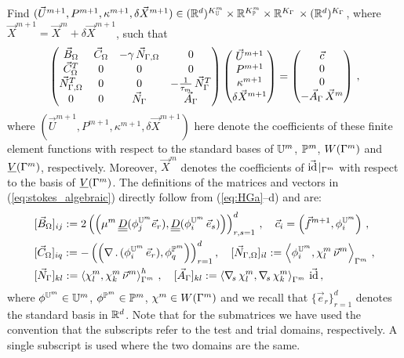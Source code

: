 Find $(\vec U^{m+1},P^{m+1}, \kappa^{m+1},\delta\vec{X}^{m+1})\in
({\mathbb R}^d)^{K^m_{\mathbb{U}}}\times {\mathbb R}^{K^m_{\mathbb{P}}} \times {\mathbb R}^{K_\Gamma}\,\times
({\mathbb R}^d)^{K_\Gamma}$, where $\vec X^{m+1} = \vec X^m+ \delta\vec X^{m+1}$, such
that
\begin{equation}
\begin{pmatrix}
\vec B_\Omega & \vec C_\Omega & -\gamma\,\vec{N}_{\Gamma,\Omega} & 0 \\
\vec C^T_\Omega & 0 & 0 & 0 \\
\vec{N}_{\Gamma,\Omega}^T & 0 & 0 & -\frac1{\tau_m}\,\vec{N}_\Gamma^T \\
0 & 0 & \vec{N}_\Gamma & \vec{A}_\Gamma
\end{pmatrix}
\begin{pmatrix}
\vec U^{m+1} \\
P^{m+1} \\
\kappa^{m+1} \\
\delta\vec{X}^{m+1}
\end{pmatrix}
=
\begin{pmatrix}
\vec c \\
0 \\
0 \\
-\vec{A}_\Gamma\,\vec X^m
\end{pmatrix} \,,
\label{eq:stokes_algebraic}
\end{equation}
where $(\vec U^{m+1},P^{m+1},\kappa^{m+1},\delta\vec{X}^{m+1})$ here denote the
coefficients of these finite element functions with respect to the standard
bases of $\mathbb{U}^m$, $\mathbb{P}^m$, $W(\Gamma^m)$ and $\underline{V}(\Gamma^m)$, respectively. Moreover,
$\vec X^m$ denotes the coefficients of $\vec{\rm id}\!\mid_{\Gamma^m}$ with respect
to the basis of $\underline{V}(\Gamma^m)$. The definitions of the matrices and vectors in
(\ref{eq:stokes_algebraic}) directly follow from (\ref{eq:HGa}--d) and are:
\begin{align*}
& [\vec B_\Omega]_{ij} := 2\left(\left(\mu^m\,\mat D(\phi_j^{\uspace^m} \vec
e_r), \mat D( \phi_i^{\uspace^m}\,\vec e_s) \right) \right)_{r,s=1}^d\,,\quad
\vec c_i = \left( \vec f^{m+1},\phi_i^{\uspace^m}\right)\,,\\
&[\vec C_\Omega]_{iq} := - \left( \left(\nabla\,.\,(\phi_i^{\uspace^m}\,\vec
e_r), \phi_q^{\pspace^m} \right) \right)_{r=1}^d,\quad
[\Nbulk]_{il} := \left\langle \phi_i^{\uspace^m}, \chi^m_l \,\vec\nu^m
\right\rangle_{\Gamma^m} \,,\\
& [\vec{N}_\Gamma]_{kl} := \left\langle \chi^m_l, \chi^m_k\,\vec\nu^m
\right\rangle_{\Gamma^m}^h \,,\quad [\vec{A}_\Gamma]_{kl} := \left\langle
\nabs\,\chi^m_l, \nabs\,\chi^m_k \right\rangle_{\Gamma^m} \,\vec\id \,,
\end{align*}
where $\phi^{\mathbb{U}^m} \in \mathbb{U}^m$, $\phi^{\mathbb{P}^m} \in \mathbb{P}^m$,
$\chi^m \in W(\Gamma^m)$ and we recall that $\{\vec e_r\}_{r=1}^d$ denotes the standard
basis in ${\mathbb R}^d$. Note that for the submatrices we have used the convention that
the subscripts refer to the test and trial domains, respectively. A single
subscript is used where the two domains are the same.

